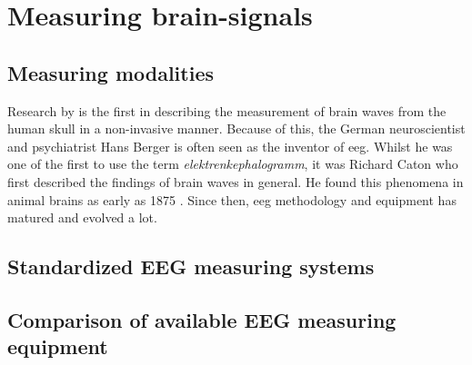 \lipsum[1-3]



\section{Measuring brain-signals}
\label{sec:biomedical_signals_measuring}

\lipsum[1-2]


\subsection{Measuring modalities}
\label{subsec:biomedical_signals_measuring_modalities}

\lipsum[1-5]

Research by \citet{human_eeg_discovery} is the first in describing the measurement of brain waves from the human skull in a non-invasive manner.
Because of this, the German neuroscientist and psychiatrist Hans Berger is often seen as the inventor of \gls{eeg}.
Whilst he was one of the first to use the term \textit{elektrenkephalogramm}, it was Richard Caton who first described the findings of brain waves in general.
He found this phenomena in animal brains as early as 1875 \citep{first_eeg}.
Since then, \gls{eeg} methodology and equipment has matured and evolved a lot.


\subsection{Standardized EEG measuring systems}
\label{subsec:biomedical_signals_measuring_standardization}

\lipsum[1-4]


\subsection{Comparison of available EEG measuring equipment}
\label{subsec:biomedical_signals_measuring_equipment}

\lipsum[1-5]


